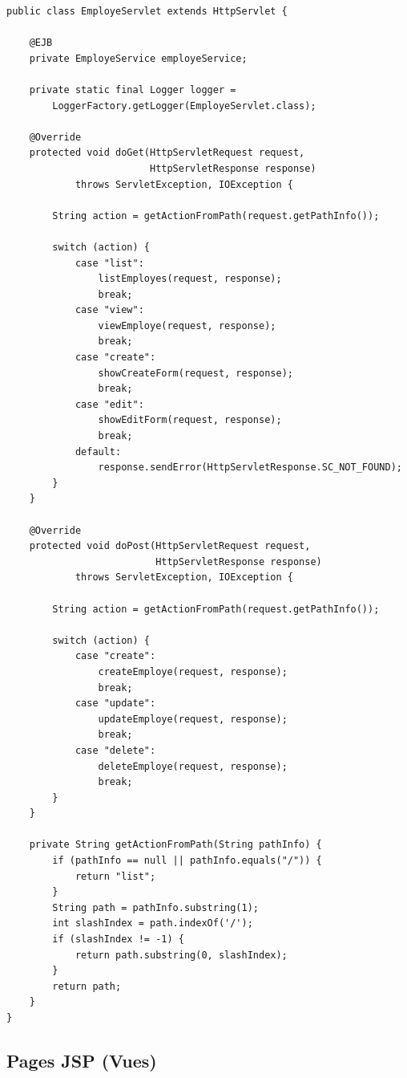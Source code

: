 \documentclass[12pt,a4paper,twoside]{report}
\begin{document}
\begin{lstlisting}[caption=Structure d'un Servlet type, label=lst:servlet-structure]
public class EmployeServlet extends HttpServlet {
    
    @EJB
    private EmployeService employeService;
    
    private static final Logger logger = 
        LoggerFactory.getLogger(EmployeServlet.class);
    
    @Override
    protected void doGet(HttpServletRequest request, 
                         HttpServletResponse response) 
            throws ServletException, IOException {
        
        String action = getActionFromPath(request.getPathInfo());
        
        switch (action) {
            case "list":
                listEmployes(request, response);
                break;
            case "view":
                viewEmploye(request, response);
                break;
            case "create":
                showCreateForm(request, response);
                break;
            case "edit":
                showEditForm(request, response);
                break;
            default:
                response.sendError(HttpServletResponse.SC_NOT_FOUND);
        }
    }
    
    @Override
    protected void doPost(HttpServletRequest request, 
                          HttpServletResponse response) 
            throws ServletException, IOException {
        
        String action = getActionFromPath(request.getPathInfo());
        
        switch (action) {
            case "create":
                createEmploye(request, response);
                break;
            case "update":
                updateEmploye(request, response);
                break;
            case "delete":
                deleteEmploye(request, response);
                break;
        }
    }
    
    private String getActionFromPath(String pathInfo) {
        if (pathInfo == null || pathInfo.equals("/")) {
            return "list";
        }
        String path = pathInfo.substring(1);
        int slashIndex = path.indexOf('/');
        if (slashIndex != -1) {
            return path.substring(0, slashIndex);
        }
        return path;
    }
}
\end{lstlisting}

\subsection{Pages JSP (Vues)}
\end{document}
